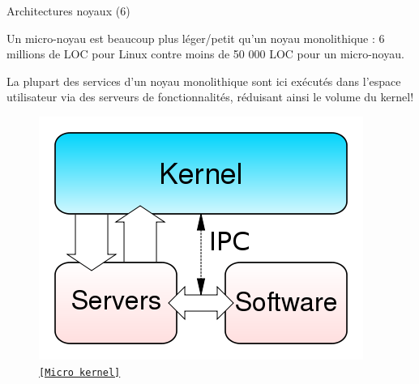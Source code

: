 \documentclass[12pt, t]{beamer}
\newcommand{\src}[2]{\vspace{-10pt}\caption{\href{#1}{\centering \tt \tiny [#2]}}}
\begin{document}
\begin{frame}{Architectures noyaux (6)}

    \vspace{8pt}
    Un micro-noyau est beaucoup plus léger/petit qu'un noyau monolithique :
    6 millions de LOC pour Linux contre moins de 50 000 LOC pour un micro-noyau.

    {
        \vspace{8pt}
        La plupart des services d'un noyau monolithique sont ici exécutés dans
        l'espace utilisateur via des serveurs de fonctionnalités, réduisant ainsi le
        volume du kernel!


        \begin{figure}
            \centering
            \includegraphics[scale=0.32]{micro.png}
            \src{http://malhar2010.blogspot.fr/2010/11/types-of-kernel.html}{Micro kernel}
        \end{figure}
    }

\end{frame}
\end{document}
